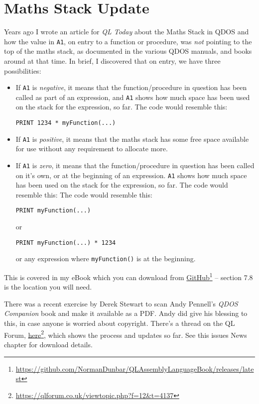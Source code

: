 
\chapter{Maths Stack Update}

Years ago I wrote an article for \emph{QL Today} about the Maths Stack
in QDOS and how the value in \texttt{A1}, on entry to a function or
procedure, was \emph{not} pointing to the top of the maths stack,
as documented in the various QDOS manuals, and books around at that
time. In brief, I discovered that on entry, we have three possibilities:
\begin{itemize}
\item If \texttt{A1} is \emph{negative}, it means that the function/procedure
in question has been called as part of an expression, and \texttt{A1}
shows how much space has been used on the stack for the expression,
so far. The code would resemble this: 
\begin{lstlisting}[basicstyle={\ttfamily},showstringspaces=false,tabsize=4]
PRINT 1234 * myFunction(...)
\end{lstlisting}
\item If \texttt{A1} is \emph{positive}, it means that the maths stack has
some free space available for use without any requirement to allocate
more. 
\item If \texttt{A1} is \emph{zero}, it means that the function/procedure
in question has been called on it's own, or at the beginning of an
expression. \texttt{A1} shows how much space has been used on the
stack for the expression, so far. The code would resemble this: The
code would resemble this: 
\begin{lstlisting}[basicstyle={\ttfamily},showstringspaces=false,tabsize=4]
PRINT myFunction(...)
\end{lstlisting}
 or 
\begin{lstlisting}[basicstyle={\ttfamily},showstringspaces=false,tabsize=4]
PRINT myFunction(...) * 1234
\end{lstlisting}
 or any expression where \lstinline[basicstyle={\ttfamily},showstringspaces=false,tabsize=4]!myFunction()!
is at the beginning.
\end{itemize}
This is covered in my eBook which you can download from \href{https://github.com/NormanDunbar/QLAssemblyLanguageBook/releases/latest}{GitHub}\footnote{\url{https://github.com/NormanDunbar/QLAssemblyLanguageBook/releases/latest}}
-- section 7.8 is the location you will need.

There was a recent exercise by Derek Stewart to scan Andy Pennell's
\emph{QDOS Companion} book and make it available as a PDF. Andy did
give his blessing to this, in case anyone is worried about copyright.
There's a thread on the QL Forum, \href{https://qlforum.co.uk/viewtopic.php?f=12&t=4137}{here}\footnote{\url{https://qlforum.co.uk/viewtopic.php?f=12\&t=4137}},
which shows the process and updates so far. See this issues News chapter
for download details.

